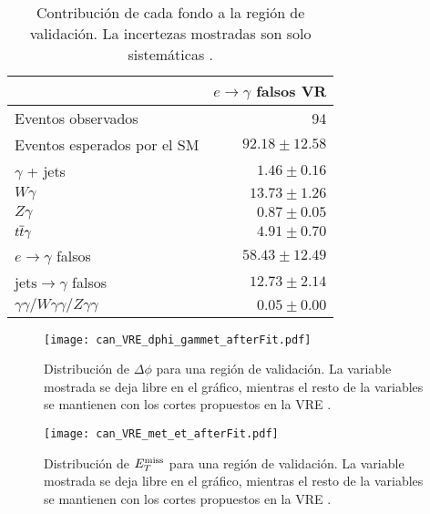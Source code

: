 \begin{table}
\centering
\caption{Contribución de cada fondo a la región de validación. La incertezas mostradas son solo sistemáticas \cite{drfran}.}
\begin{tabular}{lr}
\hline
 & $e\to\gamma$ falsos VR \\
\hline
Eventos observados & 94 \\
\hline
Eventos esperados por el SM & $92.18 \pm 12.58$ \\
\hline
$\gamma$ + jets & $1.46 \pm 0.16$ \\
$W\gamma$ & $13.73 \pm 1.26$ \\
$Z\gamma$ & $0.87 \pm 0.05$ \\
$t \overline{t}\gamma$ & $4.91 \pm 0.70$ \\
$e\rightarrow\gamma$ falsos & $58.43 \pm 12.49$ \\
$\text{jets}\rightarrow\gamma$ falsos & $12.73 \pm 2.14$ \\
$\gamma\gamma / W\gamma\gamma / Z\gamma\gamma$ & $0.05 \pm 0.00$ \\
\hline
\end{tabular}
\label{ta:vr_events}
\end{table}


\begin{figure}
\centering
\texttt{[image: can\_VRE\_dphi\_gammet\_afterFit.pdf]}
\caption{Distribución de $\Delta \phi$ para una región de validación. La variable mostrada se deja libre en el gráfico, mientras el resto de la variables se mantienen con los cortes propuestos en la VRE \cite{drfran}.}
\label{VRE_dphi}
\end{figure}

\begin{figure}
\centering
\texttt{[image: can\_VRE\_met\_et\_afterFit.pdf]}
\caption{Distribución de $E_{T}^{\text{miss}}$ para una región de validación. La variable mostrada se deja libre en el gráfico, mientras el resto de la variables se mantienen con los cortes propuestos en la VRE \cite{drfran}.}
\label{VRE_met_et}
\end{figure}
